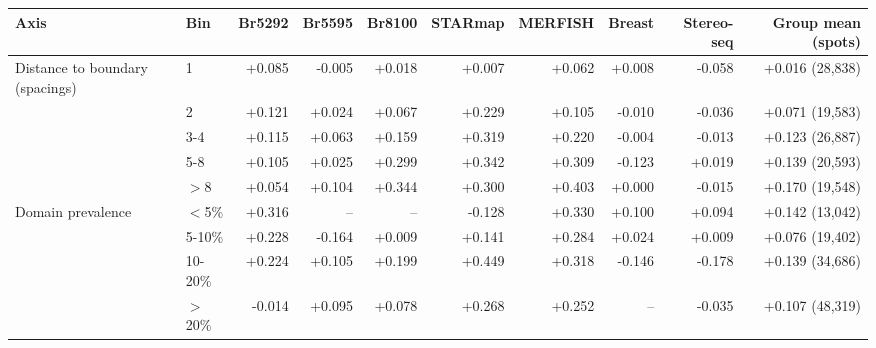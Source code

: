 \begin{tabular}{llrrrrrrrr}\toprule
Axis & Bin & Br5292 & Br5595 & Br8100 & STARmap & MERFISH & Breast & Stereo-seq & Group mean (spots) \\\midrule
Distance to boundary (spacings) & 1 & +0.085 & -0.005 & +0.018 & +0.007 & +0.062 & +0.008 & -0.058 & +0.016 (28,838) \\
 & 2 & +0.121 & +0.024 & +0.067 & +0.229 & +0.105 & -0.010 & -0.036 & +0.071 (19,583) \\
 & 3-4 & +0.115 & +0.063 & +0.159 & +0.319 & +0.220 & -0.004 & -0.013 & +0.123 (26,887) \\
 & 5-8 & +0.105 & +0.025 & +0.299 & +0.342 & +0.309 & -0.123 & +0.019 & +0.139 (20,593) \\
 & $>$8 & +0.054 & +0.104 & +0.344 & +0.300 & +0.403 & +0.000 & -0.015 & +0.170 (19,548) \\
Domain prevalence & $<$5\% & +0.316 & -- & -- & -0.128 & +0.330 & +0.100 & +0.094 & +0.142 (13,042) \\
 & 5-10\% & +0.228 & -0.164 & +0.009 & +0.141 & +0.284 & +0.024 & +0.009 & +0.076 (19,402) \\
 & 10-20\% & +0.224 & +0.105 & +0.199 & +0.449 & +0.318 & -0.146 & -0.178 & +0.139 (34,686) \\
 & $>$20\% & -0.014 & +0.095 & +0.078 & +0.268 & +0.252 & -- & -0.035 & +0.107 (48,319) \\
\bottomrule\end{tabular}
